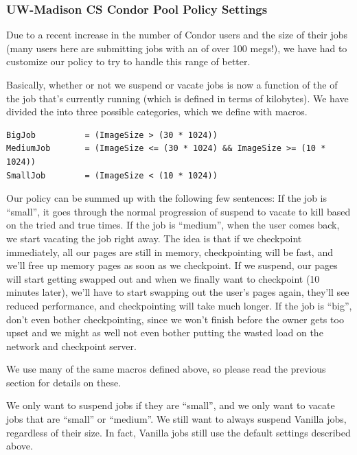 \subsubsection{UW-Madison CS Condor Pool Policy Settings}
\label{sec:UW-Policy}

Due to a recent increase in the number of Condor users and the size of
their jobs (many users here are submitting jobs with an
 of over 100 megs!), we have had to customize our
policy to try to handle this range of  better.

Basically, whether or not we suspend or vacate jobs is now a function
of the  of the job that's currently running (which is
defined in terms of kilobytes).  We have divided the 
into three possible categories, which we define with macros.

\begin{verbatim}
BigJob          = (ImageSize > (30 * 1024))
MediumJob       = (ImageSize <= (30 * 1024) && ImageSize >= (10 * 1024))
SmallJob        = (ImageSize < (10 * 1024))
\end{verbatim}

Our policy can be summed up with the following few sentences: If the
job is ``small'', it goes through the normal progression of suspend to
vacate to kill based on the tried and true times.  If the job is
``medium'', when the user comes back, we start vacating the job right
away.  The idea is that if we checkpoint immediately, all our pages
are still in memory, checkpointing will be fast, and we'll free up
memory pages as soon as we checkpoint.  If we suspend, our pages will
start getting swapped out and when we finally want to checkpoint (10
minutes later), we'll have to start swapping out the user's pages
again, they'll see reduced performance, and checkpointing will take
much longer.  If the job is ``big'', don't even bother checkpointing,
since we won't finish before the owner gets too upset and we might as
well not even bother putting the wasted load on the network and
checkpoint server.

We use many of the same macros defined above, so please read the
previous section for details on these.

We only want to suspend jobs if they are ``small'', and we only want
to vacate jobs that are ``small'' or ``medium''.  We still want to
always suspend Vanilla jobs, regardless of their size.  In fact,
Vanilla jobs still use the default settings described above.

